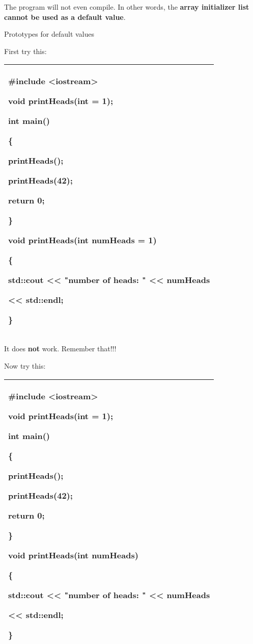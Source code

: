 \documentclass[
]{article}
\begin{document}
The program will not even compile. In other words, the \textbf{array
initializer list cannot be used as a default value}.

Prototypes for default values

First try this:

\begin{longtable}[]{@{}l@{}}
\toprule
\endhead
\begin{minipage}[t]{0.97\columnwidth}\raggedright
\#include \textless iostream\textgreater{}

void printHeads(int = 1);

int main()

\{

printHeads();

printHeads(42);

return 0;

\}

void printHeads(int numHeads = 1)

\{

std::cout \textless\textless{} "number of heads: " \textless\textless{}
numHeads

\textless\textless{} std::endl;

\}\strut
\end{minipage}\tabularnewline
\bottomrule
\end{longtable}

It does \textbf{not} work. Remember that!!!

Now try this:

\begin{longtable}[]{@{}l@{}}
\toprule
\endhead
\begin{minipage}[t]{0.97\columnwidth}\raggedright
\#include \textless iostream\textgreater{}

void printHeads(int = 1);

int main()

\{

printHeads();

printHeads(42);

return 0;

\}

void printHeads(int numHeads)

\{

std::cout \textless\textless{} "number of heads: " \textless\textless{}
numHeads

\textless\textless{} std::endl;

\}\strut
\end{minipage}\tabularnewline
\bottomrule
\end{longtable}
\end{document}
